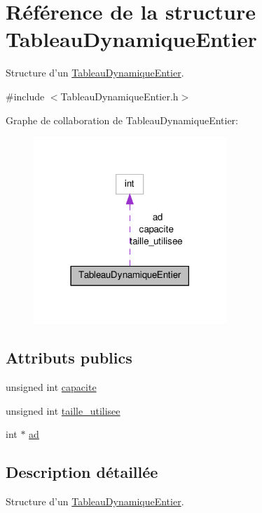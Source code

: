 \hypertarget{structTableauDynamiqueEntier}{\section{Référence de la structure Tableau\-Dynamique\-Entier}
\label{structTableauDynamiqueEntier}
}


Structure d'un \hyperlink{structTableauDynamiqueEntier}{Tableau\-Dynamique\-Entier}.  




{\ttfamily \#include $<$Tableau\-Dynamique\-Entier.\-h$>$}



Graphe de collaboration de Tableau\-Dynamique\-Entier\-:\nopagebreak
\begin{figure}[H]
\begin{center}
\leavevmode
\includegraphics[width=206pt]{structTableauDynamiqueEntier__coll__graph}
\end{center}
\end{figure}
\subsection*{Attributs publics}
\begin{DoxyCompactItemize}
\item 
unsigned int \hyperlink{structTableauDynamiqueEntier_a1fbdd8e4a11ba95e5a802fe9bb6cc2ff}{capacite}
\item 
unsigned int \hyperlink{structTableauDynamiqueEntier_ac7a23b3a002b4ce72556a1d5cebd3025}{taille\-\_\-utilisee}
\item 
int $\ast$ \hyperlink{structTableauDynamiqueEntier_a2ebf85c435f6e7db67050c4fbcaf62a9}{ad}
\end{DoxyCompactItemize}


\subsection{Description détaillée}
Structure d'un \hyperlink{structTableauDynamiqueEntier}{Tableau\-Dynamique\-Entier}. 

